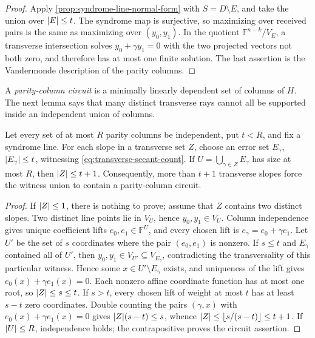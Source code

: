 \documentclass[11pt,a4paper]{amsart}
\numberwithin{equation}{section}
\theoremstyle{remark}
\newcommand{\F}{\mathbb F}\newcommand{\B}{\mathbb B}\newcommand{\K}{\mathbb K}\newcommand{\Z}{\mathbb Z}
\begin{document}
\begin{proof}
Apply \cref{prop:syndrome-line-normal-form} with \(S=D\setminus E\), and
take the union over \(\lvert E\rvert\le t\).  The syndrome map is surjective, so
maximizing over received pairs is the same as maximizing over
\((y_0,y_1)\).  In the quotient \(\F^{n-k}/V_E\), a transverse
intersection solves
\(\overline y_0+\gamma\overline y_1=0\) with the two projected vectors
not both zero, and therefore has at most one finite solution.  The last
assertion is the Vandermonde description of the parity columns.
\end{proof}

A \emph{parity-column circuit} is a minimally linearly dependent set of
columns of \(H\).  The next lemma says that many distinct transverse rays
cannot all be supported inside an independent union of columns.

\begin{lemma}
\label{lem:independent-union-rays}
Let every set of at most \(R\) parity columns be independent, put
\(t<R\), and fix a syndrome line.  For each slope in a transverse set
\(Z\), choose an error set \(E_\gamma\), \(\lvert E_\gamma\rvert\le t\),
witnessing \eqref{eq:transverse-secant-count}.  If
\(U=\bigcup_{\gamma\in Z}E_\gamma\) has size at most \(R\), then
\(\lvert Z\rvert\le t+1\).  Consequently, more than \(t+1\) transverse slopes
force the witness union to contain a parity-column circuit.
\end{lemma}

\begin{proof}
If \(\lvert Z\rvert\le1\), there is nothing to prove; assume that \(Z\) contains
two distinct slopes.  Two distinct line points lie in \(V_U\), hence
\(y_0,y_1\in V_U\).
Column independence gives unique coefficient lifts
\(e_0,e_1\in\F^U\), and every chosen lift is
\(e_\gamma=e_0+\gamma e_1\).  Let \(U'\) be the set of \(s\) coordinates
where the pair \((e_0,e_1)\) is nonzero.  If \(s\le t\) and
\(E_\gamma\) contained all of \(U'\), then
\(y_0,y_1\in V_{U'}\subseteq V_{E_\gamma}\), contradicting the
transversality of this particular witness.  Hence some
\(x\in U'\setminus E_\gamma\) exists, and uniqueness of the lift gives
\(e_0(x)+\gamma e_1(x)=0\).  Each nonzero affine coordinate function has
at most one root, so \(\lvert Z\rvert\le s\le t\).  If \(s>t\), every chosen lift of
weight at most \(t\) has at least \(s-t\) zero coordinates.  Double
counting the pairs \((\gamma,x)\) with
\(e_0(x)+\gamma e_1(x)=0\) gives
\(\lvert Z\rvert(s-t)\le s\), whence
\(\lvert Z\rvert\le\left\lfloor s/(s-t)\right\rfloor\le t+1\).  If \(\lvert U\rvert\le R\), independence
holds; the contrapositive proves the circuit assertion.
\end{proof}
\end{document}
